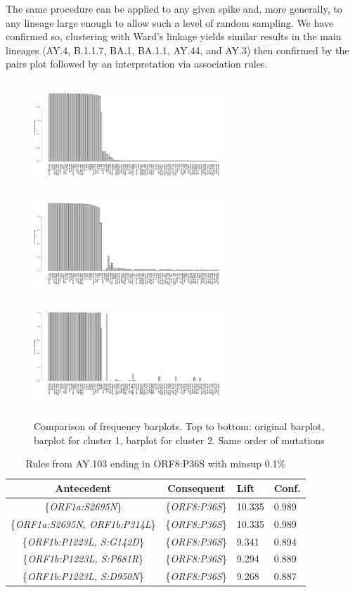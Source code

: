 \documentclass[twoside,twocolumn]{article}
\begin{document}
	The same procedure can be applied to any given spike and, more generally, to any lineage large enough to allow such a level of random sampling. We have confirmed so, clustering with Ward's linkage yields similar results in the main lineages (AY.4, B.1.1.7, BA.1, BA.1.1, AY.44, and AY.3) then confirmed by the pairs plot followed by an interpretation via association rules. 
	\begin{figure}[h]
		\caption{Comparison of frequency barplots. Top to bottom: original barplot, barplot for cluster 1, barplot for cluster 2. Same order of mutations}
		\label{comparison}
		\centering
		\includegraphics[width=70mm, height=40mm]{c0.png}
		\includegraphics[width=70mm, height=40mm]{c1.png}
		\includegraphics[width=70mm, height=40mm]{c2.png}
	\end{figure}
	\begin{table}[htb]
		\caption{Rules from AY.103 ending in ORF8:P36S with minsup 0.1\%}
		\label{table:1}
		\renewcommand{\tabcolsep}{2pc} %
		\renewcommand{\arraystretch}{1.5} %
		\begin{tabularx}{\linewidth}{| c | c | X | X |}
			\hline
			Antecedent & Consequent & Lift & Conf. \\
			\hline
			\{\textit{ORF1a:S2695N}\} & \{\textit{ORF8:P36S}\}  & 10.335 & 0.989\\
			\{\textit{ORF1a:S2695N, ORF1b:P314L}\} & \{\textit{ORF8:P36S}\} & 10.335 & 0.989\\
			\{\textit{ORF1b:P1223L, S:G142D}\} & \{\textit{ORF8:P36S}\} & 9.341 & 0.894\\
			\{\textit{ORF1b:P1223L, S:P681R}\} & \{\textit{ORF8:P36S}\} & 9.294 & 0.889\\
			\{\textit{ORF1b:P1223L, S:D950N}\} & \{\textit{ORF8:P36S}\} & 9.268 & 0.887\\
			\hline
		\end{tabularx}\\[4pt]
	\end{table}
\end{document}
